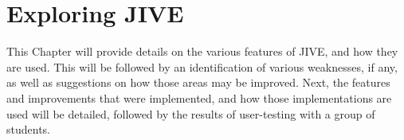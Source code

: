\chapter{Exploring JIVE}\label{jiveEnhance}

This Chapter will provide details on the various features of JIVE,  and how they are used.
This will be followed by an identification of various weaknesses, if any, as well as suggestions on how those areas may be improved.
Next, the features and improvements that were implemented, and how those implementations are used will be detailed, followed by the results of user-testing with a group of students.






